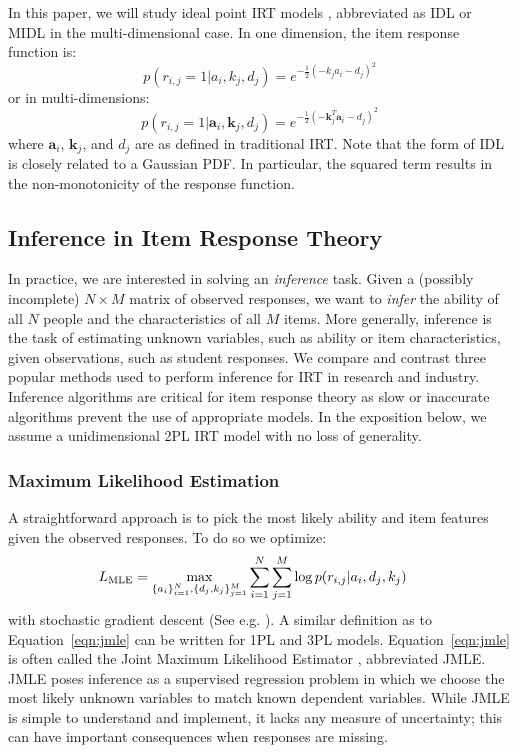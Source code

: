 In this paper, we will study ideal point IRT models \cite{maydeu2006multidimensional}, abbreviated as IDL or MIDL in the multi-dimensional case.
In one dimension, the item response function is:
\begin{equation}
    p(r_{i,j}=1|a_i,k_j,d_j) = e^{-\frac{1}{2}(-k_j a_i - d_j)^2} 
\end{equation}
or in multi-dimensions:
\begin{equation}
    p(r_{i,j}=1|\textbf{a}_i,\textbf{k}_j,d_j) = e^{-\frac{1}{2}(-\textbf{k}_j^T \textbf{a}_i - d_j)^2}
\end{equation}
where $\textbf{a}_i$, $\textbf{k}_j$, and $d_j$ are as defined in traditional IRT. Note that the form of IDL is closely related to a Gaussian PDF.
In particular, the squared term results in the non-monotonicity of the response function.

\subsection{Inference in Item Response Theory}

In practice, we are interested in solving an \textit{inference} task. Given a (possibly incomplete) $N \times M$ matrix of observed responses, we want to \textit{infer} the ability of all $N$ people and the characteristics of all $M$ items.
More generally, inference is the task of estimating unknown variables, such as ability or item characteristics, given observations, such as student responses. We compare and contrast  three popular methods used to perform inference for IRT in research and industry. Inference algorithms are critical for item response theory as slow or inaccurate algorithms prevent the use of appropriate models. In the exposition below, we assume a unidimensional 2PL IRT model with no loss of generality.

\subsubsection{Maximum Likelihood Estimation}
A straightforward approach is to pick the most likely ability and item features given the observed responses.
To do so we optimize:
\begin{align}
    L_{\textup{MLE}} &= \max_{\{a_i\}_{i=1}^N, \{d_j, k_j\}_{j=1}^M} \sum_{i=1}^N \sum_{j=1}^M \log p(r_{i,j}|a_i, d_j, k_j)
    \label{eqn:jmle}
\end{align}
with stochastic gradient descent (See e.g. \cite{Goodfellow-et-al-2016}). A similar definition as to Equation~\ref{eqn:jmle} can be written for 1PL and 3PL models. 
Equation~\ref{eqn:jmle} is often called the Joint Maximum Likelihood Estimator \cite{beguin2001mcmc,beguin2001mcmc,chen2019joint}, abbreviated JMLE. 
JMLE poses inference as a supervised regression problem in which we choose the most likely unknown variables to match known dependent variables.
While JMLE is simple to understand and implement, it lacks any measure of uncertainty; this can have important consequences when responses are missing.


